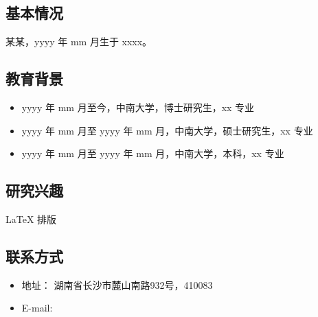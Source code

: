 
\begin{resume}
  \subsection*{基本情况}
    某某，yyyy 年 mm 月生于 xxxx。

  \subsection*{教育背景}
  \begin{itemize}
    \item yyyy 年 mm 月至今，中南大学，博士研究生，xx 专业
    \item yyyy 年 mm 月至 yyyy 年 mm 月，中南大学，硕士研究生，xx 专业
    \item yyyy 年 mm 月至 yyyy 年 mm 月，中南大学，本科，xx 专业
  \end{itemize}

  \subsection*{研究兴趣}
    \LaTeX{} 排版

  \subsection*{联系方式}
  \begin{itemize}
    \item 地址： 湖南省长沙市麓山南路932号，410083
    \item E-mail: 
  \end{itemize}
\end{resume}
